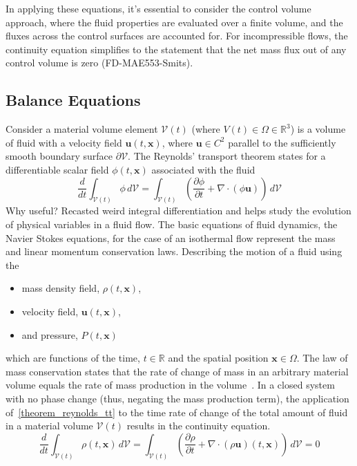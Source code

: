 In applying these equations, it's essential to consider the control volume approach, where the fluid properties are 
evaluated over a finite volume, and the fluxes across the control surfaces are accounted for. For incompressible flows, 
the continuity equation simplifies to the statement that the net mass flux out of any control volume is zero (FD-MAE553-Smits).
\subsection{Balance Equations}
Consider a material volume element $\mathcal{V}(t)$ (where $V(t) \in \Omega \in \mathbb{R}^3$) is a volume of fluid with a velocity field $\mathbf{u}(t, \mathbf{x})$, where $\mathbf{u} \in C^{2}$ parallel 
to the sufficiently smooth boundary surface $\partial\mathcal{V}$. The Reynolds' transport theorem
states for a differentiable scalar field $\phi(t, \mathbf{x})$ associated with the fluid 
\begin{equation}\label{theorem_reynolds_tt}
    \frac{d}{dt} \int_{\mathcal{V}(t)} \phi\,d\mathcal{V} =  \int_{\mathcal{V}(t)}(\frac{\partial \phi}{\partial t} + \nabla \cdot (\phi \mathbf{u}))\,d\mathcal{V} 
\end{equation}
Why useful? Recasted weird integral differentiation and helps study the evolution of physical variables in a fluid flow.
The basic equations of fluid dynamics, the Navier Stokes equations, for the case of an isothermal flow represent the mass and linear momentum conservation laws. 
Describing the motion of a fluid using the
\begin{itemize}
    \item mass density field, $\rho(t, \mathbf{x})$,
    \item velocity field, $\mathbf{u}(t, \mathbf{x})$,
    \item and pressure, $P(t, \mathbf{x})$ 
\end{itemize}
which are functions of the time, $t \in \mathbb{R}$ and the spatial position $\mathbf{x} \in \Omega$.
The law of mass conservation states that the rate of change of mass in an arbitrary material volume equals the rate of mass production in the volume~\cite{TOR?BOOK?}. In a closed system with no phase change
(thus, negating the mass production term), the application of~\ref{theorem_reynolds_tt} to the time rate of change of the total amount of fluid in a material 
volume $\mathcal{V}(t)$ results in the continuity equation.
\begin{equation*}
        \frac{d}{dt} \int_{\mathcal{V}(t)}\rho (t, \mathbf{x})\,d\mathcal{V}= \int_{\mathcal{V}(t)}(\frac{\partial \rho}{\partial t} + \nabla \cdot (\rho \mathbf{u})(t, \mathbf{x}))\,d\mathcal{V} = 0
\end{equation*}
